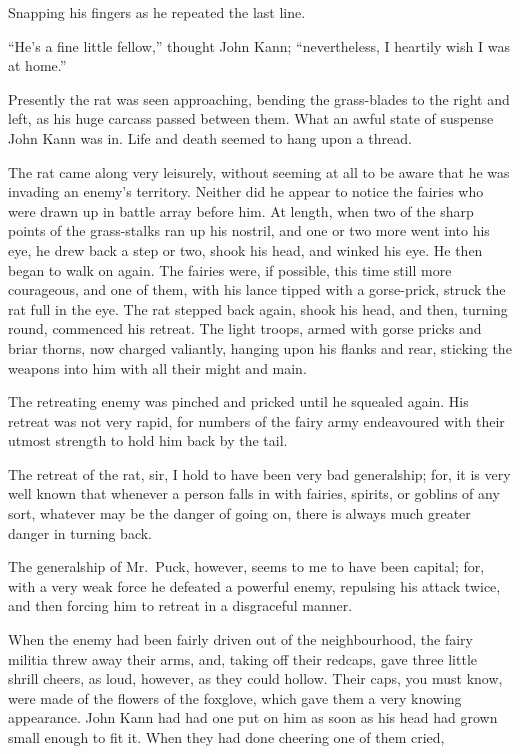 \documentclass[
  12pt,
  a5paper,
  twoside]{book}
\begin{document}
Snapping his fingers as he repeated the last line.

``He's a fine little fellow,'' thought John Kann; ``nevertheless, I
heartily wish I was at home.''

Presently the rat was seen approaching, bending the grass-blades to the
right and left, as his huge carcass passed between them. What an awful
state of suspense John Kann was in. Life and death seemed to hang upon a
thread.

The rat came along very leisurely, without seeming at all to be aware
that he was invading an enemy's territory. Neither did he appear to
notice the fairies who were drawn up in battle array before him. At
length, when two of the sharp points of the grass-stalks ran up his
nostril, and one or two more went into his eye, he drew back a step or
two, shook his head, and winked his eye. He then began to walk on again.
The fairies were, if possible, this time still more courageous, and one
of them, with his lance tipped with a gorse-prick, struck the rat full
in the eye. The rat stepped back again, shook his head, and then,
turning round, commenced his retreat. The light troops, armed with gorse
pricks and briar thorns, now charged valiantly, hanging upon his flanks
and rear, sticking the weapons into him with all their might and main.

The retreating enemy was pinched and pricked until he squealed again.
His retreat was not very rapid, for numbers of the fairy army
endeavoured with their utmost strength to hold him back by the tail.

The retreat of the rat, sir, I hold to have been very bad generalship;
for, it is very well known that whenever a person falls in with fairies,
spirits, or goblins of any sort, whatever may be the danger of going on,
there is always much greater danger in turning back.

The generalship of Mr.~Puck, however, seems to me to have been capital;
for, with a very weak force he defeated a powerful enemy, repulsing his
attack twice, and then forcing him to retreat in a disgraceful manner.

When the enemy had been fairly driven out of the neighbourhood, the
fairy militia threw away their arms, and, taking off their redcaps, gave
three little shrill cheers, as loud, however, as they could hollow.
Their caps, you must know, were made of the flowers of the foxglove,
which gave them a very knowing appearance. John Kann had had one put on
him as soon as his head had grown small enough to fit it. When they had
done cheering one of them cried,
\end{document}
